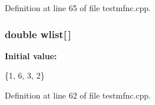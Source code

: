 Definition at line 65 of file testmfnc.\-cpp.

\subsubsection[{wlist}]{\setlength{\rightskip}{0pt plus 5cm}double wlist[$\,$]}\label{toolboxes_2rnd_2testmfnc_8cpp_a0f9888e52a4c32fd392577b5e258d45b}
{\bfseries Initial value\-:}
\begin{DoxyCode}
 
\{1, 6, 3, 2\}
\end{DoxyCode}


Definition at line 62 of file testmfnc.\-cpp.

